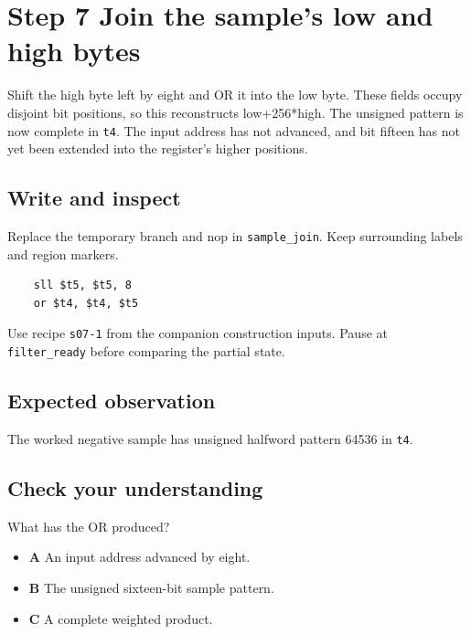 \section{Step 7 Join the sample’s low and high bytes}\label{fir-s07}

Shift the high byte left by eight and OR it into the low byte. These fields occupy disjoint bit positions, so this reconstructs low+256*high. The unsigned pattern is now complete in \texttt{t4}. The input address has not advanced, and bit fifteen has not yet been extended into the register’s higher positions.

\subsection{Write and inspect}
Replace the temporary branch and nop in \texttt{sample\_join}. Keep surrounding labels and region markers.

\begin{verbatim}
    sll $t5, $t5, 8
    or $t4, $t4, $t5
\end{verbatim}
Use recipe \texttt{s07-1} from the companion construction inputs. Pause at \texttt{filter\_ready} before comparing the partial state.

\subsection{Expected observation}
The worked negative sample has unsigned halfword pattern 64536 in \texttt{t4}.

\subsection{Check your understanding}
What has the OR produced?

\begin{itemize}
\item \textbf{A} An input address advanced by eight.
\item \textbf{B} The unsigned sixteen-bit sample pattern.
\item \textbf{C} A complete weighted product.
\end{itemize}
